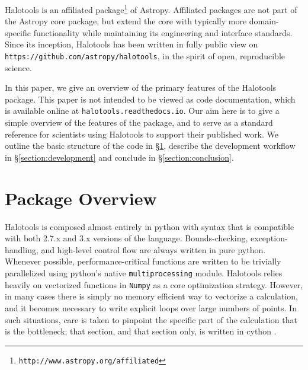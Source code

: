\documentclass[twocolumn, tighten]{aastex6}
\begin{document}
Halotools is an affiliated package\footnote{\tt http://www.astropy.org/affiliated} of Astropy. Affiliated packages are not part of the Astropy core package, but extend the core with typically more domain-specific functionality while maintaining its engineering and interface standards. Since its inception, Halotools has been written in fully public view on {\tt https://github.com/astropy/halotools}, in the spirit of open, reproducible science. 

In this paper, we give an overview of the primary features of the Halotools package. This paper is not intended to be viewed as code documentation, which is available online at {\tt halotools.readthedocs.io}. Our aim here is to give a simple overview of the features of the package, and to serve as a standard reference for scientists using Halotools to support their published work. We outline the basic structure of the code in \S\ref{section:overview}, describe the development workflow in \S\ref{section:development} and conclude in \S\ref{section:conclusion}. 

\section{Package Overview}
\label{section:overview}

Halotools is composed almost entirely in python with syntax that is compatible with both 2.7.x and 3.x versions of the language. Bounds-checking, exception-handling, and high-level control flow are always written in pure python. Whenever possible, performance-critical functions are written to be trivially parallelized using python's native {\tt multiprocessing} module. Halotools relies heavily on vectorized functions in {\tt Numpy} as a core optimization strategy. However, in many cases there is simply no memory efficient way to vectorize a calculation, and it becomes necessary to write explicit loops over large numbers of points. In such situations, care is taken to pinpoint the specific part of the calculation that is the bottleneck; that section, and that section only, is written in cython \citep{cython}. 
\end{document}
